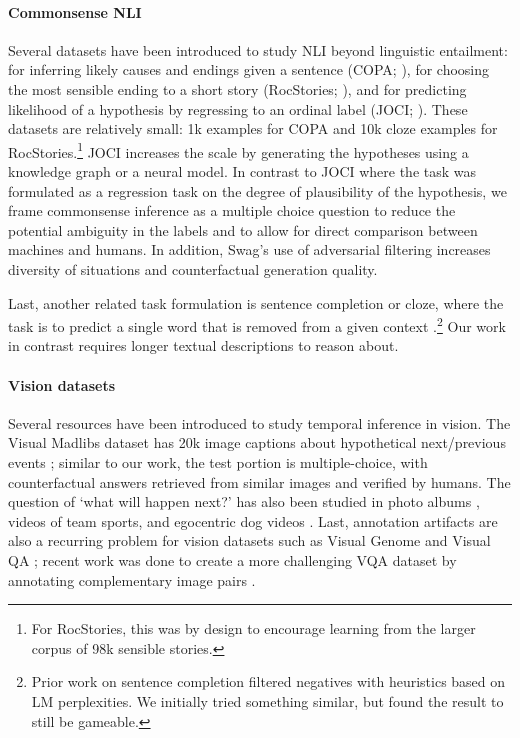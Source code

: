 \documentclass[11pt,a4paper]{article}
\newcommand\customfont[1]{{\usefont{T1}{perm}{m}{n}#1}}
\newcommand{\datasetname}{{\small\customfont{Swag}}}
\begin{document}
\paragraph{Commonsense NLI} Several datasets have been introduced to study NLI beyond linguistic entailment: for inferring likely causes and endings given a sentence (COPA; \citealp{roemmele_choice_2011}), for choosing the most sensible ending to a short story (RocStories; \citealp{mostafazadeh_corpus_2016,sharma2018tackling}), and for predicting likelihood of a hypothesis by regressing to an ordinal label (JOCI; \cite{zhang_ordinal_2017}). These datasets are relatively small: 1k examples for COPA and 10k cloze examples for RocStories.\footnote{For RocStories, this was by design to encourage learning from the larger corpus of 98k sensible stories.} JOCI increases the scale by generating the hypotheses using a knowledge graph or a neural model. 
In contrast to JOCI where the task was formulated as a regression task on the degree of plausibility of the hypothesis, we frame commonsense inference as a multiple choice question to reduce the potential ambiguity in the labels and to allow for direct comparison between machines and humans. 
In addition, \datasetname's use of adversarial filtering increases diversity of situations and counterfactual generation quality.

Last, another related task formulation is sentence completion or cloze, where the task is to predict a single word that is removed from a given context \cite{zweig2011microsoft,denis2016lambada}.\footnote{Prior work on sentence completion filtered negatives with heuristics based on LM perplexities. We initially tried something similar, but found the result to still be gameable.} 
Our work in contrast requires  longer textual descriptions to reason about. 

\paragraph{Vision datasets} Several resources have been introduced to study temporal inference in vision. The Visual Madlibs dataset has 20k image captions about hypothetical next/previous events \cite{yu_visual_2015}; similar to our work, the test portion is multiple-choice, with counterfactual answers retrieved from similar images and verified by humans. The question of `what will happen next?' has also been studied in photo albums \cite{huang2016visual}, videos of team sports, \cite{felsen2017will} and egocentric dog videos \cite{Ehsani_2018_CVPR}. Last, annotation artifacts are also a recurring problem for vision datasets such as Visual Genome \cite{zellers2018scenegraphs} and Visual QA \cite{jabri2016revisiting}; recent work was done to create a more challenging VQA dataset by annotating complementary image pairs \cite{goyal2017making}.
\end{document}
